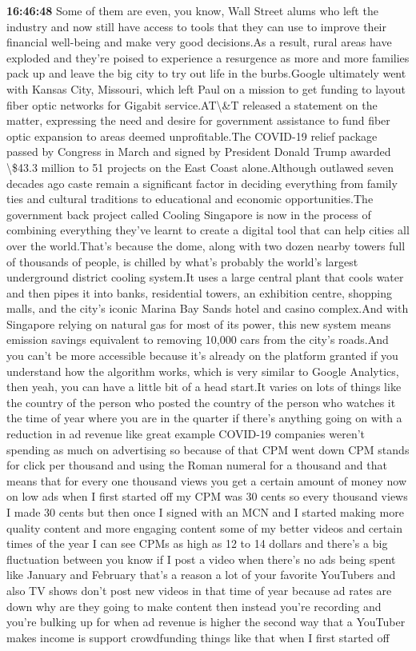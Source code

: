 \documentclass{article}%
\begin{document}
\textbf{16:46:48}%
\newline%
Some of them are even, you know, Wall Street alums who left the industry and now still have access to tools that they can use to improve their financial well{-}being and make very good decisions.As a result, rural areas have exploded and they're poised to experience a resurgence as more and more families pack up and leave the big city to try out life in the burbs.Google ultimately went with Kansas City, Missouri, which left Paul on a mission to get funding to layout fiber optic networks for Gigabit service.AT\textbackslash{}\&T released a statement on the matter, expressing the need and desire for government assistance to fund fiber optic expansion to areas deemed unprofitable.The COVID{-}19 relief package passed by Congress in March and signed by President Donald Trump awarded \textbackslash{}\$43.3 million to 51 projects on the East Coast alone.Although outlawed seven decades ago caste remain a significant factor in deciding everything from family ties and cultural traditions to educational and economic opportunities.The government back project called Cooling Singapore is now in the process of combining everything they've learnt to create a digital tool that can help cities all over the world.That's because the dome, along with two dozen nearby towers full of thousands of people, is chilled by what's probably the world's largest underground district cooling system.It uses a large central plant that cools water and then pipes it into banks, residential towers, an exhibition centre, shopping malls, and the city's iconic Marina Bay Sands hotel and casino complex.And with Singapore relying on natural gas for most of its power, this new system means emission savings equivalent to removing 10,000 cars from the city's roads.And you can't be more accessible because it's already on the platform granted if you understand how the algorithm works, which is very similar to Google Analytics, then yeah, you can have a little bit of a head start.It varies on lots of things like the country of the person who posted the country of the person who watches it the time of year where you are in the quarter if there's anything going on with a reduction in ad revenue like great example COVID{-}19 companies weren't spending as much on advertising so because of that CPM went down CPM stands for click per thousand and using the Roman numeral for a thousand and that means that for every one thousand views you get a certain amount of money now on low ads when I first started off my CPM was 30 cents so every thousand views I made 30 cents but then once I signed with an MCN and I started making more quality content and more engaging content some of my better videos and certain times of the year I can see CPMs as high as 12 to 14 dollars and there's a big fluctuation between you know if I post a video when there's no ads being spent like January and February that's a reason a lot of your favorite YouTubers and also TV shows don't post new videos in that time of year because ad rates are down why are they going to make content then instead you're recording and you're bulking up for when ad revenue is higher the second way that a YouTuber makes income is support crowdfunding things like that when I first started off 
\end{document}
